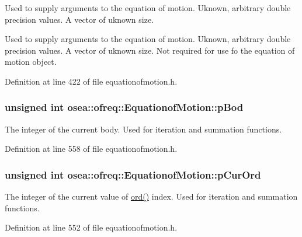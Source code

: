 Used to supply arguments to the equation of motion. Uknown, arbitrary double precision values. A vector of uknown size. 

Used to supply arguments to the equation of motion. Uknown, arbitrary double precision values. A vector of uknown size. Not required for use fo the equation of motion object. 

Definition at line 422 of file equationofmotion.\-h.

\hypertarget{classosea_1_1ofreq_1_1_equationof_motion_a5a1c11c4c4a827494a7772af0d0dddc6}{
\subsubsection[{p\-Bod}]{\setlength{\rightskip}{0pt plus 5cm}unsigned int osea\-::ofreq\-::\-Equationof\-Motion\-::p\-Bod\hspace{0.3cm}{\ttfamily [protected]}}}\label{classosea_1_1ofreq_1_1_equationof_motion_a5a1c11c4c4a827494a7772af0d0dddc6}


The integer of the current body. Used for iteration and summation functions. 



Definition at line 558 of file equationofmotion.\-h.

\hypertarget{classosea_1_1ofreq_1_1_equationof_motion_a39d41e27dcf84f163ef794a9287a0ef1}{
\subsubsection[{p\-Cur\-Ord}]{\setlength{\rightskip}{0pt plus 5cm}unsigned int osea\-::ofreq\-::\-Equationof\-Motion\-::p\-Cur\-Ord\hspace{0.3cm}{\ttfamily [protected]}}}\label{classosea_1_1ofreq_1_1_equationof_motion_a39d41e27dcf84f163ef794a9287a0ef1}


The integer of the current value of \hyperlink{classosea_1_1ofreq_1_1_equationof_motion_a31f904818ce75c9e2a2b5cff9fc707a5}{ord()} index. Used for iteration and summation functions. 



Definition at line 552 of file equationofmotion.\-h.

